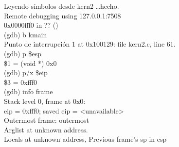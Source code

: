 \documentclass[a4paper, 12pt]{article}
\begin{document}
\begin{itemize}
			Leyendo símbolos desde kern2 \ldots hecho.\\
			Remote debugging using 127.0.0.1:7508\\
			0x0000fff0 in ?? ()\\
			(gdb) b kmain\\
			Punto de interrupción 1 at 0x100129: file kern2.c, line 61.\\
			(gdb) p \$esp\\
			\$1 = (void *) 0x0\\
			(gdb) p/x \$eip\\
			\$3 = 0xfff0\\
			(gdb) info frame\\
			Stack level 0, frame at 0x0:\\
			eip = 0xfff0; saved eip = <unavailable>\\
			Outermost frame: outermost\\
			Arglist at unknown address.\\
			Locals at unknown address, Previous frame's sp in esp\\
		\end{itemize}
\end{document}
